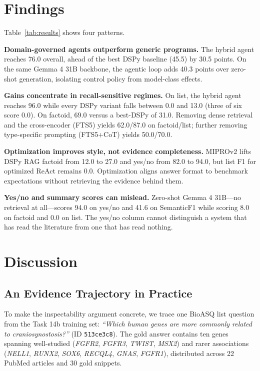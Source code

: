 \documentclass[sigconf,anonymous,review]{acmart}
\begin{document}
\section{Findings}

Table~\ref{tab:results} shows four patterns.

\textbf{Domain-governed agents outperform generic programs.}
The hybrid agent reaches 76.0 overall, ahead of the best DSPy baseline (45.5) by 30.5 points.
On the same Gemma 4 31B backbone, the agentic loop adds 40.3 points over zero-shot generation, isolating control policy from model-class effects.

\textbf{Gains concentrate in recall-sensitive regimes.}
On list, the hybrid agent reaches 96.0 while every DSPy variant falls between 0.0 and 13.0 (three of six score 0.0).
On factoid, 69.0 versus a best-DSPy of 31.0.
Removing dense retrieval and the cross-encoder (FTS5) yields 62.0/87.0 on factoid/list; further removing type-specific prompting (FTS5+CoT) yields 50.0/70.0.

\textbf{Optimization improves style, not evidence completeness.}
MIPROv2 lifts DSPy RAG factoid from 12.0 to 27.0 and yes/no from 82.0 to 94.0, but list F1 for optimized ReAct remains 0.0.
Optimization aligns answer format to benchmark expectations without retrieving the evidence behind them.

\textbf{Yes/no and summary scores can mislead.}
Zero-shot Gemma 4 31B---no retrieval at all---scores 94.0 on yes/no and 41.6 on SemanticF1 while scoring 8.0 on factoid and 0.0 on list.
The yes/no column cannot distinguish a system that has read the literature from one that has read nothing.

\section{Discussion}

\subsection{An Evidence Trajectory in Practice}

To make the inspectability argument concrete, we trace one BioASQ list question from the Task 14b training set: \emph{``Which human genes are more commonly related to craniosynostosis?''} (ID \texttt{513ce3c8}).
The gold answer contains ten genes spanning well-studied (\emph{FGFR2}, \emph{FGFR3}, \emph{TWIST}, \emph{MSX2}) and rarer associations (\emph{NELL1}, \emph{RUNX2}, \emph{SOX6}, \emph{RECQL4}, \emph{GNAS}, \emph{FGFR1}), distributed across 22 PubMed articles and 30 gold snippets.
\end{document}
